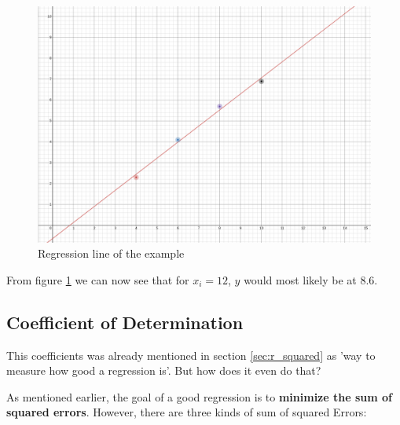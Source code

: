 \documentclass[a4paper, 11pt]{article}
\begin{document}
\begin{figure}[htb!]
    \centering
    \includegraphics[keepaspectratio=true, width=\linewidth]{regression_line.png}
    \caption{Regression line of the example}
    \label{fig:regression_line}
\end{figure}

From figure \ref{fig:regression_line} we can now see that for $x_{i}=12$, $y$ would most likely be at $8.6$.

\subsection{Coefficient of Determination}

This coefficients was already mentioned in section \ref{sec:r_squared} as 'way to measure how good a regression is'. But how does it even do that?

As mentioned earlier, the goal of a good regression is to \textbf{minimize the sum of squared errors}. However, there are three kinds of sum of squared Errors:

\vspace{10px}
\end{document}
